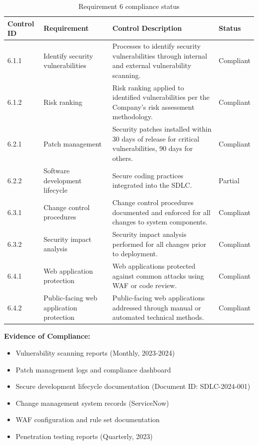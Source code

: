 \documentclass[
    language=english,
    doctype=compliance-document,
    institution=none,
]{../../omnilatex}
\begin{document}
\begin{table}[h]
\centering
\small
\begin{tabular}{p{3cm}p{5cm}p{4cm}p{3cm}}
\toprule
\textbf{Control ID} & \textbf{Requirement} & \textbf{Control Description} & \textbf{Status} \\
\midrule
6.1.1 & Identify security vulnerabilities & Processes to identify security vulnerabilities through internal and external vulnerability scanning. & Compliant \\
6.1.2 & Risk ranking & Risk ranking applied to identified vulnerabilities per the Company's risk assessment methodology. & Compliant \\
6.2.1 & Patch management & Security patches installed within 30 days of release for critical vulnerabilities, 90 days for others. & Compliant \\
6.2.2 & Software development lifecycle & Secure coding practices integrated into the SDLC. & Partial \\
6.3.1 & Change control procedures & Change control procedures documented and enforced for all changes to system components. & Compliant \\
6.3.2 & Security impact analysis & Security impact analysis performed for all changes prior to deployment. & Compliant \\
6.4.1 & Web application protection & Web applications protected against common attacks using WAF or code review. & Compliant \\
6.4.2 & Public-facing web application protection & Public-facing web applications addressed through manual or automated technical methods. & Compliant \\
\bottomrule
\end{tabular}
\caption{Requirement 6 compliance status}
\end{table}

\textbf{Evidence of Compliance:}
\begin{itemize}
    \item Vulnerability scanning reports (Monthly, 2023-2024)
    \item Patch management logs and compliance dashboard
    \item Secure development lifecycle documentation (Document ID: SDLC-2024-001)
    \item Change management system records (ServiceNow)
    \item WAF configuration and rule set documentation
    \item Penetration testing reports (Quarterly, 2023)
\end{itemize}
\end{document}
